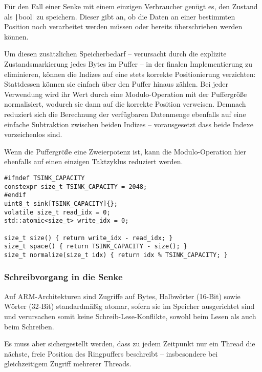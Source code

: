 Für den Fall einer Senke mit einem einzigen Verbraucher genügt es, den Zustand
als \texttt|bool| zu speichern. Dieser gibt an, ob die Daten an einer
bestimmten Position noch verarbeitet werden müssen oder bereits überschrieben
werden können.

Um diesen zusätzlichen Speicherbedarf -- verursacht durch die explizite
Zustandsmarkierung jedes Bytes im Puffer -- in der finalen Implementierung zu
eliminieren, können die Indizes auf eine stets korrekte Positionierung
verzichten: Stattdessen können sie einfach über den Puffer hinaus zählen. Bei
jeder Verwendung wird ihr Wert durch eine Modulo-Operation mit der Puffergröße
normalisiert, wodurch sie dann auf die korrekte Position verweisen. Demnach
reduziert sich die Berechnung der verfügbaren Datenmenge ebenfalls auf eine
einfache Subtraktion zwischen beiden Indizes -- vorausgesetzt dass beide Indexe
vorzeichenlos sind.

Wenn die Puffergröße eine Zweierpotenz ist, kann die Modulo-Operation hier
ebenfalls auf einen einzigen Taktzyklus reduziert werden.

\begin{code}
\begin{verbatim}
#ifndef TSINK_CAPACITY
constexpr size_t TSINK_CAPACITY = 2048;
#endif
uint8_t sink[TSINK_CAPACITY]{};
volatile size_t read_idx = 0;
std::atomic<size_t> write_idx = 0;

size_t size() { return write_idx - read_idx; }
size_t space() { return TSINK_CAPACITY - size(); }
size_t normalize(size_t idx) { return idx % TSINK_CAPACITY; }
\end{verbatim}
\end{code}

\subsubsection{Schreibvorgang in die Senke}

Auf ARM-Architekturen sind Zugriffe auf Bytes, Halbwörter (16-Bit) sowie Wörter
(32-Bit) standardmäßig atomar, sofern sie im Speicher ausgerichtet sind~\cite[S.
A3-79]{ARM_DDI0403_EE} und verursachen somit keine Schreib-Lese-Konflikte,
sowohl beim Lesen als auch beim Schreiben.

Es muss aber sichergestellt werden, dass zu jedem Zeitpunkt nur ein Thread die
nächste, freie Position des Ringpuffers beschreibt -- insbesondere bei
gleichzeitigem Zugriff mehrerer Threads.

